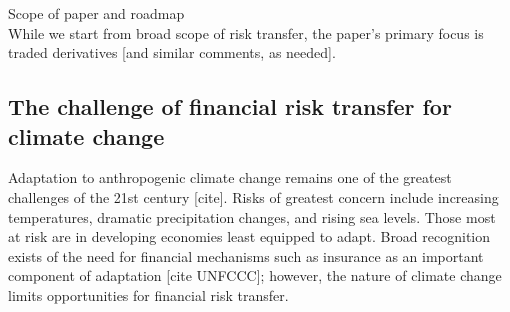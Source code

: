 \documentclass[authoryear]{article}
\begin{document}
Scope of paper and roadmap \\
While we start from broad scope of risk transfer, the paper's primary focus is traded derivatives [and similar comments, as needed].


\subsection{The challenge of financial risk transfer for climate change}
Adaptation to anthropogenic climate change remains one of the greatest challenges of the 21st century [cite]. Risks of greatest concern include increasing temperatures, dramatic precipitation changes, and rising sea levels. Those most at risk are in developing economies least equipped to adapt. Broad recognition exists of the need for financial mechanisms such as insurance as an important component of adaptation [cite UNFCCC]; however, the nature of climate change limits opportunities for financial risk transfer.
\end{document}
